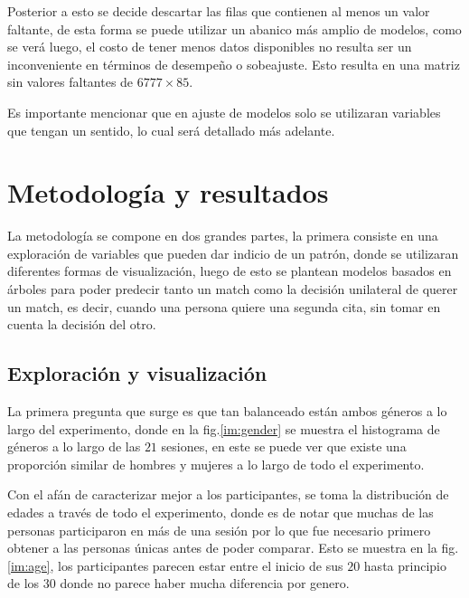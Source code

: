 Posterior a esto se decide descartar las filas que contienen al menos un valor faltante, de esta forma se puede utilizar un abanico más amplio de modelos, como se verá luego, el costo de tener menos datos disponibles no resulta ser un inconveniente en términos de desempeño o sobeajuste. Esto resulta en una matriz sin valores faltantes de $6777\times 85$.


Es importante mencionar que en ajuste de modelos solo se utilizaran variables que tengan un sentido, lo cual será detallado más adelante.

\section{Metodología y resultados}
La metodología se compone en dos grandes partes, la primera consiste en una exploración de variables que pueden dar indicio de un patrón, donde se utilizaran diferentes formas de visualización, luego de esto se plantean modelos basados en árboles para poder predecir tanto un match como la decisión unilateral de querer un match, es decir, cuando una persona quiere una segunda cita, sin tomar en cuenta la decisión del otro.

\subsection{Exploración y visualización}

La primera pregunta que surge es que tan balanceado están ambos géneros a lo largo del experimento, donde en la fig.\ref{im:gender} se muestra el histograma de géneros a lo largo de las $21$ sesiones, en este se puede ver que existe una proporción similar de hombres y mujeres a lo largo de todo el experimento.



Con el afán de caracterizar mejor a los participantes, se toma la distribución de edades a través de todo el experimento, donde es de notar que muchas de las personas participaron en más de una sesión por lo que fue necesario primero obtener a las personas únicas antes de poder comparar. Esto se muestra en la fig.\ref{im:age}, los participantes parecen estar entre el inicio de sus $20$ hasta principio de los $30$ donde no parece haber mucha diferencia por genero.

